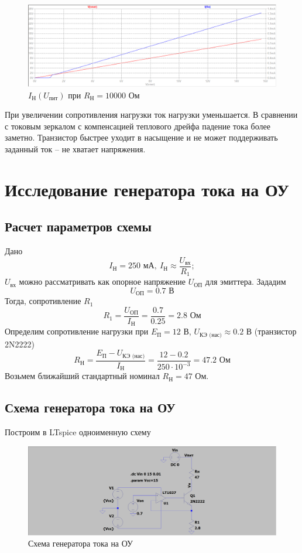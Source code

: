 \documentclass[a4paper, 12pt]{article}
\begin{document}
    \begin{figure}[H]
        \centering
        \includegraphics[scale=0.46]{2task_Iн(Vпит)_Rн10000.png}
        \captionsetup{skip=0pt}
        \caption{$I_\text{Н}\left( U_\text{пит} \right)$ при $R_\text{Н}=10000$ Ом}
        \label{fig:2task_InVlR10000}
    \end{figure}
    \noindent При увеличении сопротивления нагрузки ток нагрузки уменьшается.
    В сравнении с токовым зеркалом с компенсацией теплового дрейфа падение тока более заметно.
    Транзистор быстрее уходит в насыщение и не может поддерживать заданный ток -- не хватает напряжения.


    \section{Исследование генератора тока на ОУ}
    \subsection{Расчет параметров схемы}
    Дано
    $$
    I_\text{Н}=250\text{ мА},\ I_\text{Н}\approx\dfrac{U_\text{вх}}{R_1};
    $$
    $U_\text{вх}$ можно рассматривать как опорное напряжение $U_\text{ОП}$ для эмиттера. Зададим
    $$
    U_\text{ОП}=0.7\text{ В}
    $$
    Тогда, сопротивление $R_1$
    $$
    R_1=\dfrac{U_\text{ОП}}{I_\text{Н}}=\dfrac{0.7}{0.25}=2.8\text{ Ом}
    $$
    Определим сопротивление нагрузки при $E_\text{П}=12$ В, $U_\text{КЭ (нас)}\approx0.2$ В (транзистор 2N2222)
    $$
    R_\text{Н}=\dfrac{E_\text{П}-U_\text{КЭ (нас)}}{I_\text{Н}}=\dfrac{12-0.2}{250\cdot10^{-3}}=47.2\text{ Ом}
    $$
    Возьмем ближайший стандартный номинал $R_\text{Н}=47$ Ом.


    \subsection{Схема генератора тока на ОУ}
    Построим в LTspice одноименную схему
    \begin{figure}[H]
        \centering
        \includegraphics[scale=0.22]{scheme3.png}
        \captionsetup{skip=0pt}
        \caption{Схема генератора тока на ОУ}
        \label{fig:scheme3}
    \end{figure}
\end{document}
